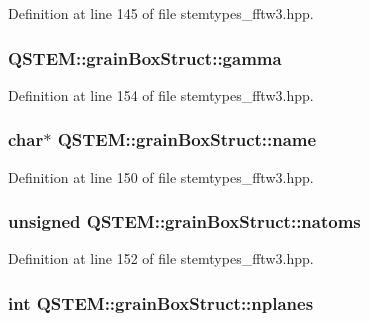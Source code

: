 Definition at line 145 of file stemtypes\-\_\-fftw3.\-hpp.

\hypertarget{struct_q_s_t_e_m_1_1grain_box_struct_af7a9ef925fd4622bc5c5c3b2f8b2900e}{
\subsubsection[{gamma}]{ Q\-S\-T\-E\-M\-::grain\-Box\-Struct\-::gamma}}\label{struct_q_s_t_e_m_1_1grain_box_struct_af7a9ef925fd4622bc5c5c3b2f8b2900e}


Definition at line 154 of file stemtypes\-\_\-fftw3.\-hpp.

\hypertarget{struct_q_s_t_e_m_1_1grain_box_struct_ad0cee5660abc0d5d2f864f71bc007c40}{
\subsubsection[{name}]{\setlength{\rightskip}{0pt plus 5cm}char$\ast$ Q\-S\-T\-E\-M\-::grain\-Box\-Struct\-::name}}\label{struct_q_s_t_e_m_1_1grain_box_struct_ad0cee5660abc0d5d2f864f71bc007c40}


Definition at line 150 of file stemtypes\-\_\-fftw3.\-hpp.

\hypertarget{struct_q_s_t_e_m_1_1grain_box_struct_a2dcfbf086b35fe5312295f1b11359ebd}{
\subsubsection[{natoms}]{\setlength{\rightskip}{0pt plus 5cm}unsigned Q\-S\-T\-E\-M\-::grain\-Box\-Struct\-::natoms}}\label{struct_q_s_t_e_m_1_1grain_box_struct_a2dcfbf086b35fe5312295f1b11359ebd}


Definition at line 152 of file stemtypes\-\_\-fftw3.\-hpp.

\hypertarget{struct_q_s_t_e_m_1_1grain_box_struct_adc5e6a8e02a53a09422828701e2ca8bb}{
\subsubsection[{nplanes}]{\setlength{\rightskip}{0pt plus 5cm}int Q\-S\-T\-E\-M\-::grain\-Box\-Struct\-::nplanes}}\label{struct_q_s_t_e_m_1_1grain_box_struct_adc5e6a8e02a53a09422828701e2ca8bb}


